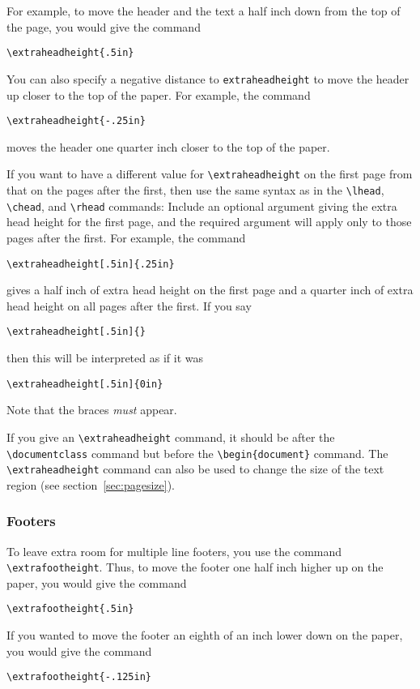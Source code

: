 \documentclass[12pt]{exam}
\begin{document}
For example, to move the header and the text a half inch
down from the top of the page, you would give the command
%
\begin{center}
\verb"\extraheadheight{.5in}"
\end{center}
%
You can also specify a negative distance to \verb"extraheadheight" to
move the header up closer to the top of the paper.  For example, the
command
%
\begin{center}
\verb"\extraheadheight{-.25in}"
\end{center}
%
moves the header one quarter inch closer to the top of the paper.

If you want to have a different value for \verb"\extraheadheight" on
the first page from that on the pages after the first, then use the
same syntax as in the \verb"\lhead", \verb"\chead", and \verb"\rhead"
commands: Include an optional argument giving the extra head height
for the first page, and the required argument will apply only to
those pages after the first.  For example, the command
%
\begin{center}
\verb"\extraheadheight[.5in]{.25in}"
\end{center}
%
gives a half inch of extra head height on the first page and a
quarter inch of extra head height on all pages after the first. 
If you say
%
\begin{center}
\verb"\extraheadheight[.5in]{}"
\end{center}
%
then this will be interpreted as if it was
%
\begin{center}
\verb"\extraheadheight[.5in]{0in}"
\end{center}
%
Note that the braces \emph{must} appear.


If you give an \verb"\extraheadheight" command, it should be after the
\verb"\documentclass" command but before the \verb"\begin{document}"
command.  The \verb"\extraheadheight" command can also be used to
change the size of the text region (see section~\ref{sec:pagesize}).




\subsubsection*{Footers}
To leave extra room for multiple line footers, you use the command
\verb"\extrafootheight".  Thus, to move the footer one half inch
higher up on the paper, you would give the command
%
\begin{center}
\verb"\extrafootheight{.5in}"
\end{center}
%
If you wanted to move the footer an eighth of an inch lower down on
the paper, you would give the command
%
\begin{center}
\verb"\extrafootheight{-.125in}"
\end{center}
\end{document}
